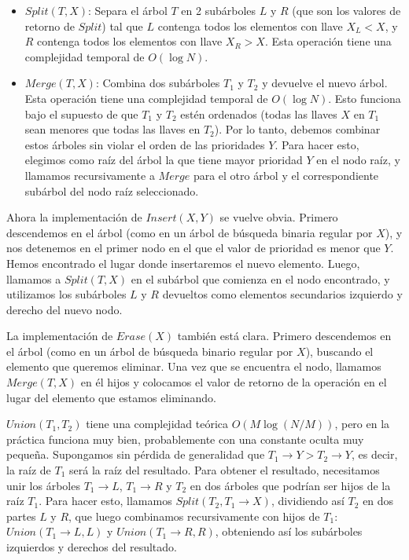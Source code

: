 \documentclass[12pt]{article}
\newcommand{\nl}{\vspace{0.3cm}}
\begin{document}
\begin{itemize}
	\item $Split(T, X)$: Separa el árbol $T$ en 2 subárboles $L$ y $R$ (que son los valores de retorno de $Split$) tal que $L$ contenga todos los elementos con llave $X_L < X$, y $R$ contenga todos los elementos con llave $X_R > X$. Esta operación tiene una complejidad temporal de $O(\log N)$.
	\item $Merge(T, X)$: Combina dos subárboles $T_1$ y $T_2$ y devuelve el nuevo árbol. Esta operación tiene una complejidad temporal de $O(\log N)$. Esto funciona bajo el supuesto de que $T_1$ y $T_2$ estén ordenados (todas las llaves $X$ en $T_1$ sean menores que todas las llaves en $T_2$). Por lo tanto, debemos combinar estos árboles sin violar el orden de las prioridades $Y$. Para hacer esto, elegimos como raíz del árbol la que tiene mayor prioridad $Y$ en el nodo raíz, y llamamos recursivamente a $Merge$ para el otro árbol y el correspondiente subárbol del nodo raíz seleccionado.
\end{itemize}

Ahora la implementación de $Insert(X, Y)$ se vuelve obvia. Primero descendemos en el árbol (como en un árbol de búsqueda binaria regular por $X$), y nos detenemos en el primer nodo en el que el valor de prioridad es menor que $Y$. Hemos encontrado el lugar donde insertaremos el nuevo elemento. Luego, llamamos a $Split(T, X)$ en el subárbol que comienza en el nodo encontrado, y utilizamos los subárboles $L$ y $R$ devueltos como elementos secundarios izquierdo y derecho del nuevo nodo.

\nl

La implementación de $Erase(X)$ también está clara. Primero descendemos en el árbol (como en un árbol de búsqueda binario regular por $X$), buscando el elemento que queremos eliminar. Una vez que se encuentra el nodo, llamamos $Merge(T, X)$ en él hijos y colocamos el valor de retorno de la operación en el lugar del elemento que estamos eliminando.

\nl

$Union(T_1, T_2)$ tiene una complejidad teórica $O(M \log (N / M))$, pero en la práctica funciona muy bien, probablemente con una constante oculta muy pequeña. Supongamos sin pérdida de generalidad que $T_1 \rightarrow Y > T_2 \rightarrow Y$, es decir, la raíz de $T_1$ será la raíz del resultado. Para obtener el resultado, necesitamos unir los árboles $T_1 \rightarrow L$, $T_1 \rightarrow R$ y $T_2$ en dos árboles que podrían ser hijos de la raíz $T_1$. Para hacer esto, llamamos $Split(T_2, T_1 \rightarrow X)$, dividiendo así $T_2$ en dos partes $L$ y $R$, que luego combinamos recursivamente con hijos de $T_1$: $Union(T_1 \rightarrow L, L)$ y $Union(T_1 \rightarrow R, R)$, obteniendo así los subárboles izquierdos y derechos del resultado.
\end{document}
